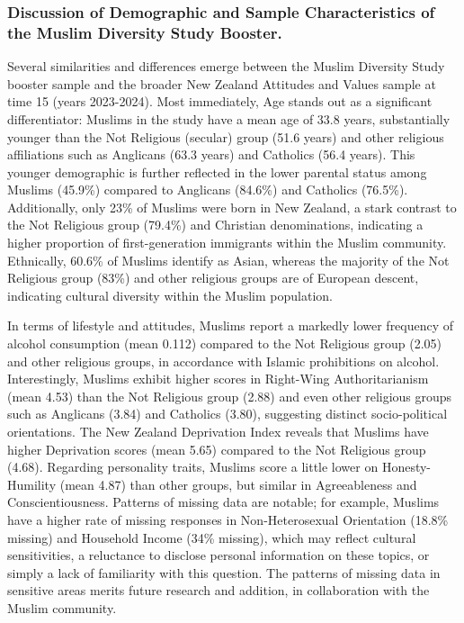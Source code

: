 \documentclass[
  single column]{article}
\begin{document}
\subsubsection{Discussion of Demographic and Sample Characteristics of
the Muslim Diversity Study
Booster.}\label{discussion-of-demographic-and-sample-characteristics-of-the-muslim-diversity-study-booster.}

Several similarities and differences emerge between the Muslim Diversity
Study booster sample and the broader New Zealand Attitudes and Values
sample at time 15 (years 2023-2024). Most immediately, Age stands out as
a significant differentiator: Muslims in the study have a mean age of
33.8 years, substantially younger than the Not Religious (secular) group
(51.6 years) and other religious affiliations such as Anglicans (63.3
years) and Catholics (56.4 years). This younger demographic is further
reflected in the lower parental status among Muslims (45.9\%) compared
to Anglicans (84.6\%) and Catholics (76.5\%). Additionally, only 23\% of
Muslims were born in New Zealand, a stark contrast to the Not Religious
group (79.4\%) and Christian denominations, indicating a higher
proportion of first-generation immigrants within the Muslim community.
Ethnically, 60.6\% of Muslims identify as Asian, whereas the majority of
the Not Religious group (83\%) and other religious groups are of
European descent, indicating cultural diversity within the Muslim
population.

In terms of lifestyle and attitudes, Muslims report a markedly lower
frequency of alcohol consumption (mean 0.112) compared to the Not
Religious group (2.05) and other religious groups, in accordance with
Islamic prohibitions on alcohol. Interestingly, Muslims exhibit higher
scores in Right-Wing Authoritarianism (mean 4.53) than the Not Religious
group (2.88) and even other religious groups such as Anglicans (3.84)
and Catholics (3.80), suggesting distinct socio-political orientations.
The New Zealand Deprivation Index reveals that Muslims have higher
Deprivation scores (mean 5.65) compared to the Not Religious group
(4.68). Regarding personality traits, Muslims score a little lower on
Honesty-Humility (mean 4.87) than other groups, but similar in
Agreeableness and Conscientiousness. Patterns of missing data are
notable; for example, Muslims have a higher rate of missing responses in
Non-Heterosexual Orientation (18.8\% missing) and Household Income (34\%
missing), which may reflect cultural sensitivities, a reluctance to
disclose personal information on these topics, or simply a lack of
familiarity with this question. The patterns of missing data in
sensitive areas merits future research and addition, in collaboration
with the Muslim community.
\end{document}
